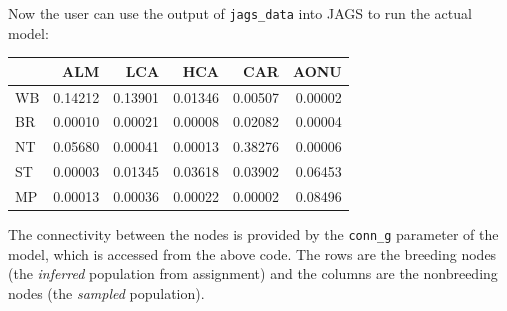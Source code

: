 \documentclass[
]{book}
\newenvironment{Shaded}{\begin{snugshade}}{\end{snugshade}}
\newcommand{\AttributeTok}[1]{\textcolor[rgb]{0.13,0.29,0.53}{#1}}
\newcommand{\ConstantTok}[1]{\textcolor[rgb]{0.56,0.35,0.01}{#1}}
\newcommand{\DecValTok}[1]{\textcolor[rgb]{0.00,0.00,0.81}{#1}}
\newcommand{\FunctionTok}[1]{\textcolor[rgb]{0.13,0.29,0.53}{\textbf{#1}}}
\newcommand{\NormalTok}[1]{#1}
\newcommand{\OtherTok}[1]{\textcolor[rgb]{0.56,0.35,0.01}{#1}}
\newcommand{\SpecialCharTok}[1]{\textcolor[rgb]{0.81,0.36,0.00}{\textbf{#1}}}
\newcommand{\StringTok}[1]{\textcolor[rgb]{0.31,0.60,0.02}{#1}}
\begin{document}
Now the user can use the output of \texttt{jags\_data} into JAGS to run the actual model:

\begin{Shaded}
\end{Shaded}

\begin{tabular}{l|r|r|r|r|r}
\hline
  & ALM & LCA & HCA & CAR & AONU\\
\hline
WB & 0.14212 & 0.13901 & 0.01346 & 0.00507 & 0.00002\\
\hline
BR & 0.00010 & 0.00021 & 0.00008 & 0.02082 & 0.00004\\
\hline
NT & 0.05680 & 0.00041 & 0.00013 & 0.38276 & 0.00006\\
\hline
ST & 0.00003 & 0.01345 & 0.03618 & 0.03902 & 0.06453\\
\hline
MP & 0.00013 & 0.00036 & 0.00022 & 0.00002 & 0.08496\\
\hline
\end{tabular}

The connectivity between the nodes is provided by the \texttt{conn\_g} parameter of the model, which is accessed from the above code. The rows are the breeding nodes (the \emph{inferred} population from assignment) and the columns are the nonbreeding nodes (the \emph{sampled} population).
\end{document}
